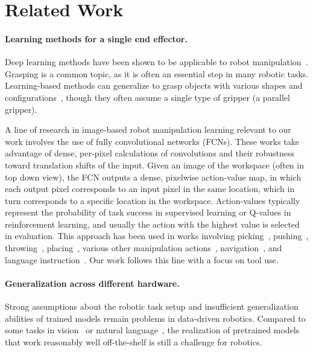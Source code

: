 \documentclass[10pt,twocolumn,letterpaper]{article}
\begin{document}



\section{Related Work}
\label{sec:related}

\paragraph{Learning methods for a single end effector.} Deep learning methods have been shown to be applicable to robot manipulation~\cite{gu2017deep, kroemer2021review}. Grasping is a common topic, as it is often an essential step in many robotic tasks. Learning-based methods can generalize to grasp objects with various shapes and configurations~\cite{caldera2018review, mahler2017dex, zeng2018learning, pinto2016supersizing}, though they often assume a single type of gripper (\ie a parallel gripper).

A line of research in image-based robot manipulation learning relevant to our work involves the use of fully convolutional networks (FCNs). These works take advantage of dense, per-pixel calculations of convolutions and their robustness toward translation shifts of the input. Given an image of the workspace (often in top down view), the FCN outputs a dense, pixelwise action-value map, in which each output pixel corresponds to an input pixel in the same location, which in turn corresponds to a specific location in the workspace. Action-values typically represent the probability of task success in supervised learning or Q-values in reinforcement learning, and usually the action with the highest value is selected in evaluation. This approach has been used in works involving picking~\cite{zeng2018robotic, xu2020adagrasp}, pushing~\cite{zeng2018learning}, throwing~\cite{zeng2020tossingbot}, placing~\cite{zakka2020form2fit}, various other manipulation actions~\cite{zeng2020transporter, seita_bags_2021}, navigation~\cite{wu2020spatial, wu2021spatial}, and language instruction~\cite{shridhar2021cliport}. Our work follows this line with a focus on tool use.

\vspace{-10pt}

\paragraph{Generalization across different hardware.} Strong assumptions about the robotic task setup and insufficient generalization abilities of trained models remain problems in data-driven robotics. Compared to some tasks in vision~\cite{he2016deep,he2017mask} or natural language~\cite{lewis-etal-2020-bart, radford2019language}, the realization of pretrained models that work reasonably well off-the-shelf is still a challenge for robotics.
\end{document}
